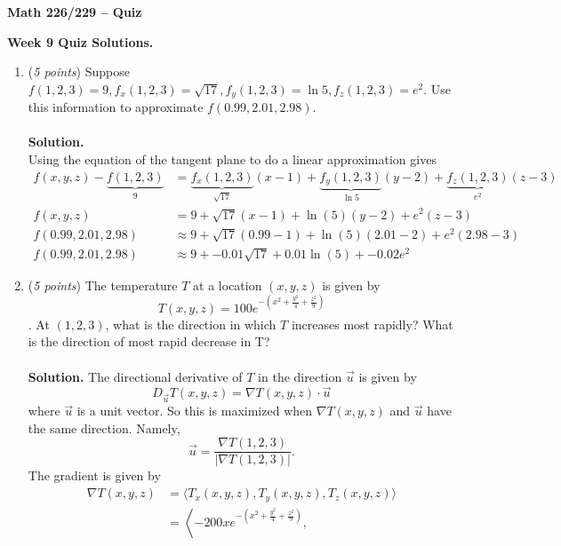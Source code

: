 \documentclass[12 pt]{article}
\begin{document}
	\begin{center}
		\textbf{\hfill Math 226/229 -- Quiz} \\
	\end{center}
	\medskip

	\noindent
	\textbf{Week 9 Quiz Solutions.} \hfill
	\vspace{.1in}
	\hspace*{0.2in}
	\medskip
	\noindent
  \begin{enumerate}
		\item (\textit{5 points})
		Suppose $f(1,2,3)=9, f_x(1,2,3)=\sqrt{17}, f_y(1,2,3) = \ln 5, f_z(1,2,3) = e^2$. Use this information to approximate $f(0.99, 2.01, 2.98)$.
    \\~\\
    \textbf{Solution.}
    \\
		Using the equation of the tangent plane to do a linear approximation gives \begin{align*}
			f(x, y, z) - \underbrace{f(1, 2, 3)}_9
			&= \underbrace{f_x(1,2,3)}_{\sqrt{17}}(x - 1) +
			\underbrace{f_y(1,2,3)}_{\ln 5}(y - 2) +
			\underbrace{f_z(1,2,3)}_{e^2}(z - 3) \\
			f(x, y, z) &= 9 + \sqrt{17}(x-1) + \ln(5)(y-2) + e^2(z-3) \\
			f(0.99, 2.01, 2.98) &\approx 9 + \sqrt{17}(0.99-1) + \ln(5)(2.01-2) + e^2(2.98-3) \\
			f(0.99, 2.01, 2.98) &\approx 9 + -0.01\sqrt{17} + 0.01\ln(5) + -0.02e^2
		\end{align*}
		\item (\textit{5 points})
		The temperature $T$ at a location $(x, y, z)$ is given by \[
			T(x,y,z) = 100e^{-(x^2+\frac{y^2}{4}+\frac{z^2}{9})}
		\]. At $(1,2,3)$, what is the direction
		in which $T$ increases most rapidly?
		What is the direction of most rapid decrease in T?
		\\~\\
    \textbf{Solution.}
		The directional derivative of $T$ in the direction $\vec u$ is given by \[
			D_{\vec u}T(x,y,z) = \nabla T(x,y,z) \cdot \vec u
		\] where $\vec u$ is a unit vector. So this is maximized when
		$\nabla T(x,y,z)$ and $\vec u$ have the same direction. Namely, \[
			\vec u = \frac{\nabla T(1,2,3)}{|\nabla T(1,2,3)|}.
		\]
		The gradient is given by \begin{align*}
			\nabla T(x,y,z)
			&= \langle T_x(x,y,z), T_y(x,y,z), T_z(x,y,z) \rangle \\
			&= \left\langle
				-200xe^{-(x^2+\frac{y^2}{4}+\frac{z^2}{9})},

\end{align*}
\end{enumerate}
\end{document}
